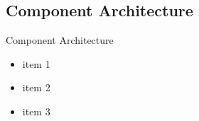 \subsection{Component Architecture}
\begin{frame}{Component Architecture}
	\begin{itemize}
		\item item 1
		\item item 2
		\item item 3
	\end{itemize}
\end{frame}
